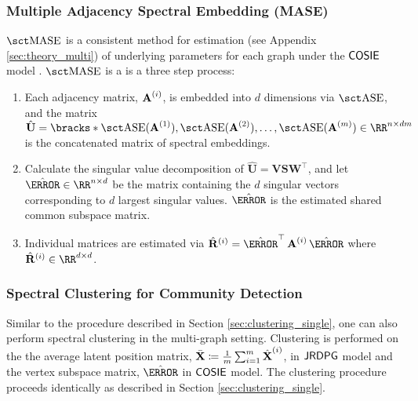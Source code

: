 \subsubsection{Multiple Adjacency Spectral Embedding (MASE)}\label{sec:mase}
$\mase$ is a consistent method for estimation (see Appendix \ref{sec:theory_multi}) of underlying parameters for each graph under the $\operatorname{\mathsf{COSIE}}$ model \cite{arroyo2019inference}. $\mase$ is a is a three step process:
\begin{enumerate}
    \item Each adjacency matrix, $\operatorname{\mathbf{A}}^{(i)}$, is embedded into $d$ dimensions via $\ase$, and the matrix $\hat{\mathbf{U}} = \bracks*{\ase(\A^{(1)}), \ase(\A^{(2)}), \ldots, \ase(\A^{(m)})} \in \RR^{n\times dm}$ is the concatenated matrix of spectral embeddings.
    \item Calculate the singular value decomposition of $\hat{\mathbf{U}}=\mathbf{V}\mathbf{S}\mathbf{W}^\top$, and let  $\hat{\V} \in \RR^{n\times d}$ be the matrix containing  the $d$ singular vectors corresponding to $d$ largest singular values. $\hat\V$ is the estimated shared common subspace matrix.
    \item  Individual matrices are estimated via $\hat{\mathbf{R}}^{(i)} = \hat{\V}^\top\A^{(i)} \hat{\V}$ where $\hat{\mathbf{R}}^{(i)}\in \RR^{d \times d}$.
\end{enumerate}

\subsubsection{Spectral Clustering for Community Detection} \label{sec:clustering_multi}
Similar to the procedure described in Section \ref{sec:clustering_single}, one can also perform spectral clustering in the multi-graph setting. Clustering is performed on the the average latent position matrix, $\bar{\operatorname{\mathbf{X}}} \coloneqq \frac{1}{m}\sum_{i=1}^m \hat{\operatorname{\mathbf{X}}}^{(i)}$, in $\operatorname{\mathsf{JRDPG}}$ model and the vertex subspace matrix, $\hat{\V}$ in $\operatorname{\mathsf{COSIE}}$ model. The clustering procedure proceeds identically as described in Section \ref{sec:clustering_single}. %

